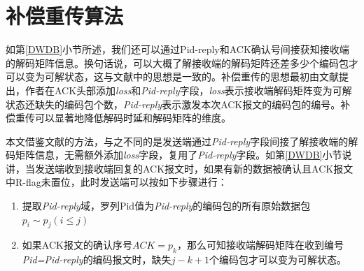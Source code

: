 \section{补偿重传算法}
如第\ref{DWDB}小节所述，我们还可以通过Pid-reply和ACK确认号间接获知接收端的解码矩阵信息。换句话说，可以大概了解接收端的解码矩阵还差多少个编码包才可以变为可解状态，这与文献\cite{song2011self}中的思想是一致的。补偿重传的思想最初由文献\cite{5403816}提出，作者在ACK头部添加\emph{loss}和\emph{Pid-reply}字段，\emph{loss}表示接收端解码矩阵变为可解状态还缺失的编码包个数，\emph{Pid-reply}表示激发本次ACK报文的编码包的编号。补偿重传可以显著地降低解码时延和解码矩阵的维度。
\par
本文借鉴文献\cite{5403816}的方法，与之不同的是发送端通过\emph{Pid-reply}字段间接了解接收端的解码矩阵信息，无需额外添加\emph{loss}字段，复用了\emph{Pid-reply}字段。如第\ref{DWDB}小节说讲，当发送端收到接收端回复的ACK报文时，如果有新的数据被确认且ACK报文中R-flag未置位，此时发送端可以按如下步骤进行：
\begin{enumerate}[fullwidth,itemindent=2em,label=(\arabic*)]
	\item 提取\emph{Pid-reply}域，罗列Pid值为\emph{Pid-reply}的编码包的所有原始数据包$p_i \sim p_j\left(i \le j\right)$
	\item 如果ACK报文的确认序号$ACK=p_k$，那么可知接收端解码矩阵在收到编号\emph{Pid=Pid-reply}的编码报文时，缺失$j-k+1$个编码包才可以变为可解状态。
\end{enumerate}
